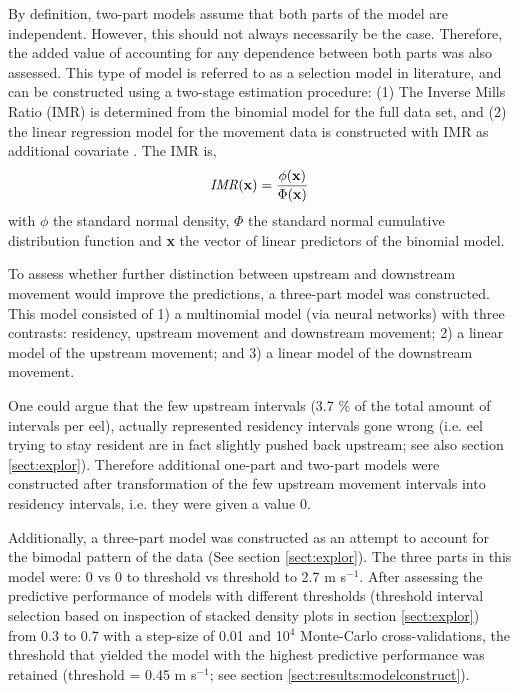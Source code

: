 \documentclass[preprint,12pt,authoryear]{elsarticle}
\begin{document}
By definition, two-part models assume that both parts of the model are independent. However, this should not always necessarily be the case. Therefore, the added value of accounting for any dependence between both parts was also assessed. This type of model is referred to as a selection model in literature, and can be constructed using a two-stage estimation procedure: (1) The Inverse Mills Ratio (IMR) is determined from the binomial model for the full data set, and (2) the linear regression model for the movement data is constructed with IMR as additional covariate \citep{Heckman1979SampleError}. The IMR is, 
\begin{equation}
\label{eq:IMR}
\textrm{\textit{IMR}}(\mathbf{x})=\frac{\phi (\mathbf{x}) }{\Phi (\mathbf{x})}
\end{equation}
with $\phi$ the standard normal density, $\Phi$ the standard normal cumulative distribution function and \textbf{x} the vector of linear predictors of the binomial model. 

To assess whether further distinction between upstream and downstream movement would improve the predictions, a three-part model was constructed. This model consisted of 1) a multinomial model (via neural networks) with three contrasts: residency, upstream movement and downstream movement; 2) a linear model of the upstream movement; and 3) a linear model of the downstream movement.

One could argue that the few upstream intervals (3.7 \% of the total amount of intervals per eel), actually represented residency intervals gone wrong (i.e. eel trying to stay resident are in fact slightly pushed back upstream; see also section \ref{sect:explor}). Therefore additional one-part and two-part models were constructed after transformation of the few upstream movement intervals into residency intervals, i.e. they were given a value 0.

Additionally, a three-part model was constructed as an attempt to account for the bimodal pattern of the data (See section \ref{sect:explor}). The three parts in this model were: 0 vs 0 to threshold vs threshold to 2.7 m s$^{-1}$. After assessing the predictive performance of models with different thresholds (threshold interval selection based on inspection of stacked density plots in section \ref{sect:explor}) from 0.3 to 0.7 with a step-size of 0.01 and 10$^{4}$ Monte-Carlo cross-validations, the threshold that yielded the model with the highest predictive performance was retained (threshold = 0.45 m s$^{-1}$; see section \ref{sect:results:modelconstruct}). 
\end{document}
